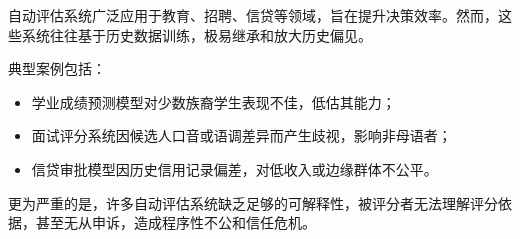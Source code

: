 
自动评估系统广泛应用于教育、招聘、信贷等领域，旨在提升决策效率。然而，这些系统往往基于历史数据训练，极易继承和放大历史偏见。

典型案例包括：

\begin{itemize}
	\item 学业成绩预测模型对少数族裔学生表现不佳，低估其能力；
	\item 面试评分系统因候选人口音或语调差异而产生歧视，影响非母语者；
	\item 信贷审批模型因历史信用记录偏差，对低收入或边缘群体不公平。
\end{itemize}

更为严重的是，许多自动评估系统缺乏足够的可解释性，被评分者无法理解评分依据，甚至无从申诉，造成程序性不公和信任危机。